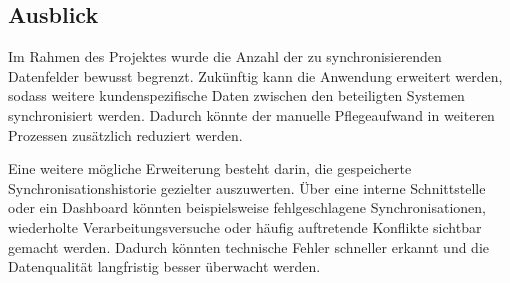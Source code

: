 \subsection{Ausblick}
\label{sec:Ausblick}
Im Rahmen des Projektes wurde die Anzahl der zu synchronisierenden Datenfelder bewusst begrenzt.
Zukünftig kann die Anwendung erweitert werden, sodass weitere kundenspezifische Daten zwischen den beteiligten Systemen synchronisiert werden.
Dadurch könnte der manuelle Pflegeaufwand in weiteren Prozessen zusätzlich reduziert werden.
\par\smallskip
Eine weitere mögliche Erweiterung besteht darin, die gespeicherte Synchronisationshistorie gezielter auszuwerten.
Über eine interne Schnittstelle oder ein Dashboard könnten beispielsweise fehlgeschlagene Synchronisationen,
wiederholte Verarbeitungsversuche oder häufig auftretende Konflikte sichtbar gemacht werden.
Dadurch könnten technische Fehler schneller erkannt und die Datenqualität langfristig besser überwacht werden.